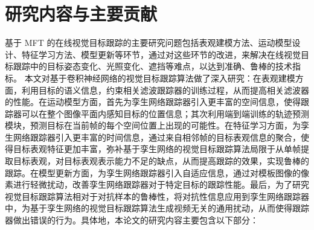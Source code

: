 \section{研究内容与主要贡献}
基于 MFT 的在线视觉目标跟踪的主要研究问题包括表观建模方法、运动模型设计、特征学习方法、模型更新等环节，通过对这些环节的改进，来解决在线视觉目标跟踪中的目标姿态变化、光照变化、遮挡等难点，以达到准确、鲁棒的技术指标。
本文对基于卷积神经网络的视觉目标跟踪算法做了深入研究：在表观建模方面，利用目标的语义信息，约束相关滤波跟踪器的训练过程，从而提高相关滤波器的性能。在运动模型方面，首先为孪生网络跟踪器引入更丰富的空间信息，使得跟踪器可以在整个图像平面内感知目标的位置信息；其次利用端到端训练的轨迹预测模块，预测目标在当前帧的每个空间位置上出现的可能性。在特征学习方面，为孪生网络跟踪器引入更丰富的时间信息，通过来自相邻帧的目标表观信息的聚合，使得目标表观特征更加丰富，弥补基于孪生网络的视觉目标跟踪算法局限于从单帧提取目标表观，对目标表观表示能力不足的缺点，从而提高跟踪的效果，实现鲁棒的跟踪。在模型更新方面，为孪生网络跟踪器引入自适应信息，通过对模板图像的像素进行轻微扰动，改善孪生网络跟踪器对于特定目标的跟踪性能。最后，为了研究视觉目标跟踪算法相对于对抗样本的鲁棒性，将对抗性信息应用到孪生网络跟踪器中，为基于孪生网络的视觉目标跟踪算法生成视频无关的通用扰动，从而使得跟踪器做出错误的行为。具体地，本论文的研究内容主要包含以下部分：
